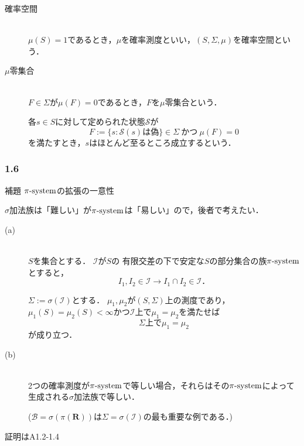 \documentclass{jsarticle}
\begin{document}
\begin{description}
   \item[\rm 確率空間]\mbox{}\\
   $\mu(S)=1$であるとき，$\mu$を確率測度といい，$(S,\Sigma,\mu)$を確率空間という．
   \item[\rm $\mu$零集合]\mbox{}\\
   $F\in\Sigma$が$\mu(F)=0$であるとき，$F$を$\mu$零集合という．

    各$s\in S$に対して定められた状態$\mathcal{S}$が
    \begin{equation}
        F:=\{ s:\mathcal{S}(s)は偽 \} \in\Sigma\ かつ\ \mu(F)=0 \nonumber
    \end{equation}
    を満たすとき，$s$はほとんど至るところ成立するという．
\end{description}


\subsubsection*{1.6}
補題 $\pi{\rm \text{-}system}$の拡張の一意性

$\sigma$加法族は「難しい」が$\pi{\rm \text{-}system}$は「易しい」ので，後者で考えたい．

\begin{description}
   \item[(a)]\mbox{}\\
        $S$を集合とする．
        $\mathcal{I}$が$S$の
        有限交差の下で安定な$S$の部分集合の族$\pi{\rm\text{-}system}$とすると，
        \begin{equation}
            I_1,I_2\in\mathcal{I} \rightarrow I_1\cap I_2\in\mathcal{I} ． \nonumber
        \end{equation}
        
        $\Sigma:=\sigma(\mathcal{I})$とする．
        $\mu_1,\mu_2$が$(S,\Sigma)$上の測度であり，$\mu_1(S)=\mu_2(S)<\infty$かつ$\mathcal{I}上で\mu_1=\mu_2$を満たせば
        \begin{equation}
            \Sigma 上で \mu_1=\mu_2 \nonumber
        \end{equation}
        が成り立つ．
    \item[(b)]\mbox{}\\
        2つの確率測度が$\pi{\rm\text{-}system}$で等しい場合，それらはその$\pi{\rm\text{-}system}$によって生成される$\sigma$加法族で等しい．
        
        ($\mathcal{B}=\sigma(\pi(\mathbf{R}))$は$\Sigma=\sigma(\mathcal{I})$の最も重要な例である．)
\end{description}
証明はA1.2-1.4
\end{document}
